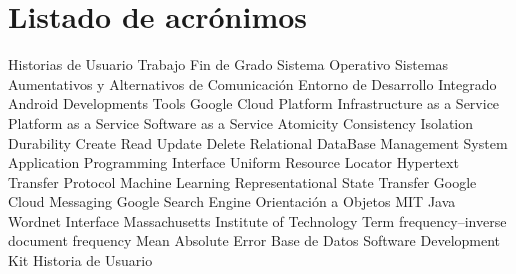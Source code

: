 \chapter{Listado de acrónimos}

{\small
\begin{acronym}[XXXXXXXX]
  		 {Historias de Usuario}	
   	 {Trabajo Fin de Grado}
  		 {Sistema Operativo}
      {Sistemas Aumentativos y Alternativos de Comunicación}
   	 {Entorno de Desarrollo Integrado}
   	 {Android Developments Tools}
   	 {Google Cloud Platform}
      {Infrastructure as a Service}
      {Platform as a Service}
  	 {Software as a Service}
   	 {Atomicity Consistency Isolation Durability}
  	 {Create Read Update Delete}
  	 {Relational DataBase Management System}
       {Application Programming Interface}
   	 {Uniform Resource Locator}
   	 {Hypertext Transfer Protocol}
  		 {Machine Learning}
  	 {Representational State Transfer}
  	 {Google Cloud Messaging}
       {Google Search Engine}
  		 {Orientación a Objetos}
   	 {MIT Java Wordnet Interface}
  	 {Massachusetts Institute of Technology}
  	 {Term frequency–inverse document frequency}
  	 {Mean Absolute Error} 
    	 {Base de Datos}
   	 {Software Development Kit}
  		 {Historia de Usuario}
\end{acronym}
}




